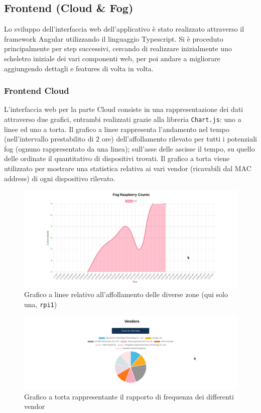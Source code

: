 \subsection{Frontend (Cloud \& Fog)}

Lo sviluppo dell'interfaccia web dell'applicativo è stato realizzato attraverso il framework Angular utilizzando il linguaggio Typescript.
Si è proceduto principalmente per step successivi, cercando di realizzare inizialmente uno scheletro iniziale dei vari componenti web, per poi andare a migliorare aggiungendo dettagli e features di volta in volta.

\subsubsection{Frontend Cloud}

L'interfaccia web per la parte Cloud consiste in una rappresentazione dei dati attraverso due grafici, entrambi realizzati grazie alla libreria \texttt{Chart.js}: uno a linee ed uno a torta.
Il grafico a linee rappresenta l'andamento nel tempo (nell'intervallo prestabilito di 2 ore) dell'affollamento rilevato per tutti i potenziali fog (ognuno rappresentato da una linea); sull'asse delle ascisse il tempo, su quello delle ordinate il quantitativo di dispositivi trovati.
Il grafico a torta viene utilizzato per mostrare una statistica relativa ai vari vendor (ricavabili dal MAC address) di ogni dispositivo rilevato.

\begin{figure}[H]
  \centering
  \includegraphics[width=\textwidth]{res/fig/cloud-chart.jpg}
  \caption{Grafico a linee relativo all'affollamento delle diverse zone (qui solo una, \texttt{rpi1})}%
  \label{fig:cloud-chart}
\end{figure}

\begin{figure}[H]
  \centering
  \includegraphics[width=\textwidth]{res/fig/cloud-pie.jpg}
  \caption{Grafico a torta rappresentante il rapporto di frequenza dei differenti vendor}%
  \label{fig:cloud-pie}
\end{figure}

